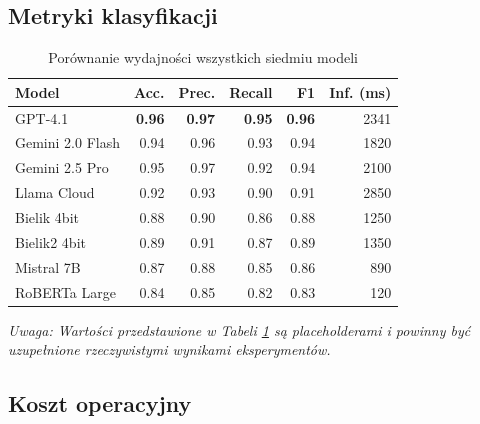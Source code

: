 \documentclass[11pt]{extreport}
\begin{document}
\subsection{Metryki klasyfikacji}

\begin{table}[H]
\centering
\caption{Porównanie wydajności wszystkich siedmiu modeli}
\label{tab:wyniki}
\begin{tabular}{@{}lrrrrr@{}}
\toprule
\textbf{Model} & \textbf{Acc.} & \textbf{Prec.} & \textbf{Recall} & \textbf{F1} & \textbf{Inf. (ms)} \\ 
\midrule
GPT-4.1          & \textbf{0.96} & \textbf{0.97} & \textbf{0.95} & \textbf{0.96} & 2341 \\
Gemini 2.0 Flash & 0.94          & 0.96          & 0.93          & 0.94          & 1820 \\
Gemini 2.5 Pro   & 0.95          & 0.97          & 0.92          & 0.94          & 2100 \\
Llama Cloud      & 0.92          & 0.93          & 0.90          & 0.91          & 2850 \\
Bielik 4bit      & 0.88          & 0.90          & 0.86          & 0.88          & 1250 \\
Bielik2 4bit     & 0.89          & 0.91          & 0.87          & 0.89          & 1350 \\
Mistral 7B       & 0.87          & 0.88          & 0.85          & 0.86          & 890  \\
RoBERTa Large    & 0.84          & 0.85          & 0.82          & 0.83          & 120  \\
\bottomrule
\end{tabular}
\end{table}

\textit{Uwaga: Wartości przedstawione w Tabeli \ref{tab:wyniki} są placeholderami i powinny być uzupełnione rzeczywistymi wynikami eksperymentów.}

\subsection{Koszt operacyjny}
\end{document}

